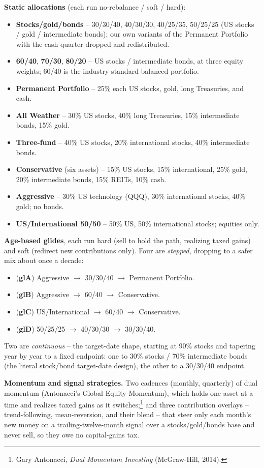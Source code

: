 \documentclass[11pt]{article}
\begin{document}
\smallskip
\noindent\textbf{Static allocations} (each run no-rebalance / soft / hard):
\begin{itemize}
\item \textbf{Stocks/gold/bonds} -- 30/30/40, 40/30/30, 40/25/35, 50/25/25 (US stocks / gold /
intermediate bonds); our own variants of the Permanent Portfolio with the cash quarter dropped and
redistributed.
\item \textbf{60/40}, \textbf{70/30}, \textbf{80/20} -- US stocks / intermediate bonds, at three
equity weights; 60/40 is the industry-standard balanced portfolio.
\item \textbf{Permanent Portfolio} -- 25\% each US stocks, gold, long Treasuries, and cash.
\item \textbf{All Weather} -- 30\% US stocks, 40\% long Treasuries, 15\% intermediate bonds, 15\% gold.
\item \textbf{Three-fund} -- 40\% US stocks, 20\% international stocks, 40\% intermediate bonds.
\item \textbf{Conservative} (six assets) -- 15\% US stocks, 15\% international, 25\% gold, 20\%
intermediate bonds, 15\% REITs, 10\% cash.
\item \textbf{Aggressive} -- 30\% US technology (QQQ), 30\% international stocks, 40\% gold; no bonds.
\item \textbf{US/International 50/50} -- 50\% US, 50\% international stocks; equities only.
\end{itemize}

\noindent\textbf{Age-based glides}, each run hard (sell to hold the path, realizing taxed gains) and
soft (redirect new contributions only). Four are \emph{stepped}, dropping to a safer mix about once a
decade:
\begin{itemize}
\item (\textbf{glA}) Aggressive $\to$ 30/30/40 $\to$ Permanent Portfolio.
\item (\textbf{glB}) Aggressive $\to$ 60/40 $\to$ Conservative.
\item (\textbf{glC}) US/International $\to$ 60/40 $\to$ Conservative.
\item (\textbf{glD}) 50/25/25 $\to$ 40/30/30 $\to$ 30/30/40.
\end{itemize}
Two are \emph{continuous} -- the target-date shape, starting at 90\% stocks and tapering year by year
to a fixed endpoint: one to 30\% stocks / 70\% intermediate bonds (the literal stock/bond target-date
design), the other to a 30/30/40 endpoint.

\noindent\textbf{Momentum and signal strategies.} Two cadences (monthly, quarterly) of dual momentum
(Antonacci's Global Equity Momentum), which holds one asset at a time and realizes taxed gains as it
switches;\footnote{Gary Antonacci, \emph{Dual Momentum Investing} (McGraw-Hill, 2014).} and three
contribution overlays -- trend-following, mean-reversion, and their blend -- that steer only each
month's new money on a trailing-twelve-month signal over a stocks/gold/bonds base and never sell, so
they owe no capital-gains tax.
\end{document}
